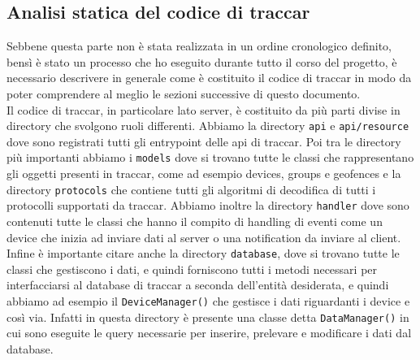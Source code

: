 \documentclass[a4paper,titlepage,12pt]{book}
\begin{document}
\subsection{\sffamily
Analisi statica del codice di traccar}
Sebbene questa parte non è stata realizzata in un ordine cronologico definito, bensì è stato un processo che ho eseguito durante tutto il corso del progetto, è necessario descrivere in generale come è costituito il codice di traccar in modo da poter comprendere al meglio le sezioni successive di questo documento.\\
Il codice di traccar, in particolare lato server, è costituito da più parti divise in directory che svolgono ruoli differenti. Abbiamo la directory \texttt{api} e \texttt{api/resource} dove sono registrati tutti gli entrypoint delle api di traccar. Poi tra le directory più importanti abbiamo i \texttt{models} dove si trovano tutte le classi che rappresentano gli oggetti presenti in traccar, come ad esempio devices, groups e geofences e la directory \texttt{protocols} che contiene tutti gli algoritmi di decodifica di tutti i protocolli supportati da traccar. Abbiamo inoltre la directory \texttt{handler} dove sono contenuti tutte le classi che hanno il compito di handling di eventi come un device che inizia ad inviare dati al server o una notification da inviare al client. Infine è importante citare anche la directory \texttt{database}, dove si trovano tutte le classi che gestiscono i dati, e quindi forniscono tutti i metodi necessari per interfacciarsi al database di traccar a seconda dell'entità desiderata, e quindi abbiamo ad esempio il \texttt{DeviceManager()} che gestisce i dati riguardanti i device e così via. Infatti in questa directory è presente una classe detta \texttt{DataManager()} in cui sono eseguite le query necessarie per inserire, prelevare e modificare i dati dal database.
\end{document}
